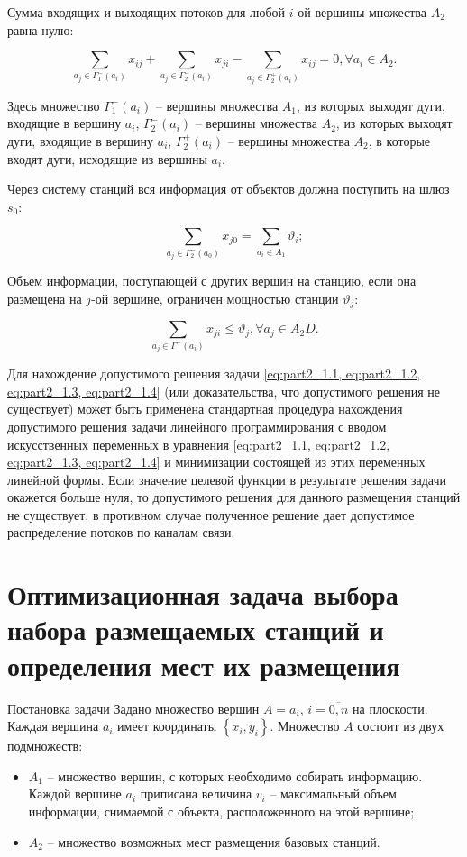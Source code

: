 Сумма входящих и выходящих потоков для любой $i$-ой вершины множества $A_2$ равна нулю:

\begin{equation}\label{eq:part2_1.2}
    \sum_{a_j \in \Gamma_1^-(a_i)} x_{ij} + \sum_{a_j \in \Gamma_2^-(a_i)} x_{ji} -  \sum_{a_j \in \Gamma_2^+(a_i)} x_{ij} =0 ,\forall a_i \in A_2. 
\end{equation}

Здесь множество $\Gamma_1^-(a_i)$ – вершины множества $A_1$, из которых выходят дуги, входящие в вершину $a_i$, $\Gamma_2^-(a_i)$ – вершины множества $A_2$, из которых выходят дуги, входящие в  вершину $a_i$, $\Gamma_2^+(a_i)$ – вершины множества $A_2$, в которые входят дуги, исходящие из вершины $a_i$.

Через систему станций вся информация от объектов  должна поступить  на шлюз $s_0$:

\begin{equation}\label{eq:part2_1.3}
    \sum_{a_j \in \Gamma_2^-(a_0)} x_{j0} =  \sum_{a_i \in A_1} \vartheta_i;
\end{equation}

Объем информации, поступающей с других вершин на станцию, если она размещена на $j$-ой вершине, ограничен мощностью станции $\vartheta_j$:

\begin{equation}\label{eq:part2_1.4}
    \sum_{a_j \in \Gamma^-(a_i)} x_{ji} \leqslant \vartheta_j, \forall a_j \in A_2D.
\end{equation}

Для нахождение допустимого решения задачи \cref{eq:part2_1.1, eq:part2_1.2, eq:part2_1.3, eq:part2_1.4} (или доказательства, что допустимого решения не существует) может быть применена стандартная процедура нахождения допустимого решения задачи линейного программирования с вводом искусственных переменных в уравнения \cref{eq:part2_1.1, eq:part2_1.2, eq:part2_1.3, eq:part2_1.4} и минимизации состоящей из этих переменных линейной формы. Если значение целевой функции в результате решения задачи окажется больше нуля, то допустимого решения для данного размещения станций не существует, в противном случае полученное решение дает допустимое распределение потоков по каналам связи.

\section{Оптимизационная задача выбора набора размещаемых станций и определения мест их размещения}
Постановка задачи
Задано множество вершин $A = a_i$, $i=\overline{0,n}$ на плоскости. Каждая вершина $a_i$ имеет координаты $\left\{ x_i, y_i \right\}$.
Множество $A$ состоит из двух подмножеств: 
\begin{itemize}
    \item $A_1$ -- множество вершин, с которых необходимо собирать информацию. Каждой вершине $a_i$ приписана   величина $v_i$ -- максимальный объем информации, снимаемой с объекта, расположенного на этой вершине;
    \item $A_2$ -- множество возможных мест размещения базовых станций. 
\end{itemize}

